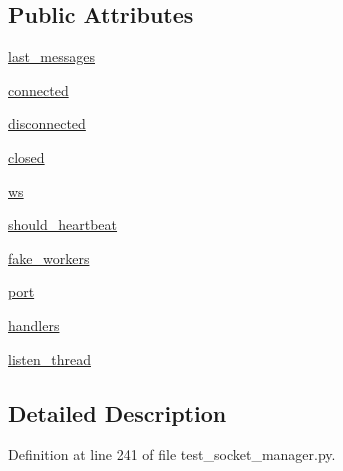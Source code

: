\subsection*{Public Attributes}
\begin{DoxyCompactItemize}
\item 
\hyperlink{classparlai_1_1mturk_1_1core_1_1legacy__2018_1_1test_1_1test__socket__manager_1_1MockSocket_a1d5e7384dfc012697289b7de69ca5f40}{last\+\_\+messages}
\item 
\hyperlink{classparlai_1_1mturk_1_1core_1_1legacy__2018_1_1test_1_1test__socket__manager_1_1MockSocket_a0f58089c10c365e456a381de5b5d5a27}{connected}
\item 
\hyperlink{classparlai_1_1mturk_1_1core_1_1legacy__2018_1_1test_1_1test__socket__manager_1_1MockSocket_a55a243647ce7e5307e0df97b8279b471}{disconnected}
\item 
\hyperlink{classparlai_1_1mturk_1_1core_1_1legacy__2018_1_1test_1_1test__socket__manager_1_1MockSocket_a63b985c345fee8fa14cd8bdf688fe20b}{closed}
\item 
\hyperlink{classparlai_1_1mturk_1_1core_1_1legacy__2018_1_1test_1_1test__socket__manager_1_1MockSocket_a11f2c298092c1846ec5a2a8ded7c7e9c}{ws}
\item 
\hyperlink{classparlai_1_1mturk_1_1core_1_1legacy__2018_1_1test_1_1test__socket__manager_1_1MockSocket_ac88a4fa8e42513e99a8c0dc5d1292419}{should\+\_\+heartbeat}
\item 
\hyperlink{classparlai_1_1mturk_1_1core_1_1legacy__2018_1_1test_1_1test__socket__manager_1_1MockSocket_af2d58b3f57ca49c7020180afca9f22f5}{fake\+\_\+workers}
\item 
\hyperlink{classparlai_1_1mturk_1_1core_1_1legacy__2018_1_1test_1_1test__socket__manager_1_1MockSocket_afecbb453d4910a0851f6d35fe34d07a4}{port}
\item 
\hyperlink{classparlai_1_1mturk_1_1core_1_1legacy__2018_1_1test_1_1test__socket__manager_1_1MockSocket_a6564079a240413e618f9074b1864e905}{handlers}
\item 
\hyperlink{classparlai_1_1mturk_1_1core_1_1legacy__2018_1_1test_1_1test__socket__manager_1_1MockSocket_a9ebea6ec703fb3cc62c70e7d51dabb51}{listen\+\_\+thread}
\end{DoxyCompactItemize}


\subsection{Detailed Description}


Definition at line 241 of file test\+\_\+socket\+\_\+manager.\+py.



